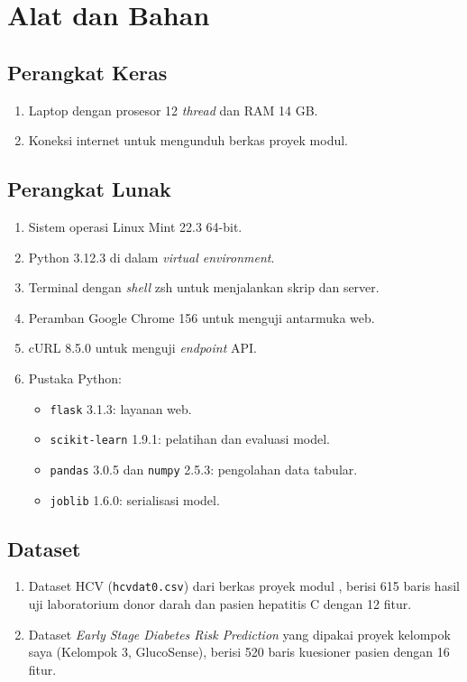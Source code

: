\documentclass[a4paper,oneside,12pt]{report}
\begin{document}
\clearpage

\chapter{Alat dan Bahan}

\section{Perangkat Keras}
\begin{enumerate}[noitemsep, topsep=2pt, parsep=1pt]
	\item Laptop dengan prosesor 12 \textit{thread} dan RAM 14 GB.
	\item Koneksi internet untuk mengunduh berkas proyek modul.
\end{enumerate}

\section{Perangkat Lunak}
\begin{enumerate}[noitemsep, topsep=2pt, parsep=1pt]
	\item Sistem operasi Linux Mint 22.3 64-bit.
	\item Python 3.12.3 di dalam \textit{virtual environment}.
	\item Terminal dengan \textit{shell} zsh untuk menjalankan skrip dan server.
	\item Peramban Google Chrome 156 untuk menguji antarmuka web.
	\item cURL 8.5.0 untuk menguji \textit{endpoint} API.
	\item Pustaka Python:
	      \begin{itemize}[noitemsep, topsep=1pt, parsep=0.5pt]
		      \item \texttt{flask} 3.1.3: layanan web.
		      \item \texttt{scikit-learn} 1.9.1: pelatihan dan evaluasi model.
		      \item \texttt{pandas} 3.0.5 dan \texttt{numpy} 2.5.3: pengolahan data tabular.
		      \item \texttt{joblib} 1.6.0: serialisasi model.
	      \end{itemize}
\end{enumerate}

\section{Dataset}
\begin{enumerate}[noitemsep, topsep=2pt, parsep=1pt]
	\item Dataset HCV (\texttt{hcvdat0.csv}) dari berkas proyek modul \cite{uci-hcv}, berisi 615 baris hasil uji laboratorium donor darah dan pasien hepatitis C dengan 12 fitur.
	\item Dataset \textit{Early Stage Diabetes Risk Prediction} \cite{uci-diabetes, islam2020} yang dipakai proyek kelompok saya (Kelompok 3, GlucoSense), berisi 520 baris kuesioner pasien dengan 16 fitur.
\end{enumerate}
\end{document}
